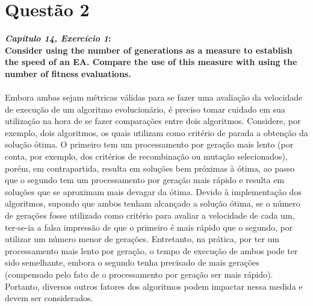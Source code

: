 \documentclass{report}
\begin{document}
\section*{Questão 2}

\textbf{\textit{Capítulo 14, Exercício 1}:}\\

\textbf{Consider using the number of generations as a measure to establish the speed of an EA. Compare the use of this measure with using the number of fitness evaluations.}\\

\paragraph{} Embora ambas sejam métricas válidas para se fazer uma avaliação da velocidade de execução de um algoritmo evolucionário, é preciso tomar cuidado em sua utilização na hora de se fazer comparações entre dois algoritmos. Considere, por exemplo, dois algoritmos, os quais utilizam como critério de parada a obtenção da solução ótima. O primeiro tem um processamento por geração mais lento (por conta, por exemplo, dos critérios de recombinação ou mutação selecionados), porém, em contrapartida, resulta em soluções bem próximas à ótima, ao passo que o segundo tem um processamento por geração mais rápido e resulta em soluções que se aproximam mais devagar da ótima. Devido à implementação dos algoritmos, supondo que ambos tenham alcançado a solução ótima, se o número de gerações fosse utilizado como critério para avaliar a velocidade de cada um, ter-se-ia a falsa impressão de que o primeiro é mais rápido que o segundo, por utilizar um número menor de gerações. Entretanto, na prática, por ter um processamento mais lento por geração, o tempo de execução de ambos pode ter sido semelhante, embora o segundo tenha precisado de mais gerações (compensado pelo fato de o processamento por geração ser mais rápido). Portanto, diversos outros fatores dos algoritmos podem impactar nessa medida e devem ser considerados.\\
\end{document}
